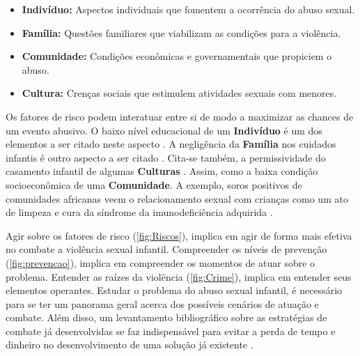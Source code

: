 \begin{itemize}
  \item \textbf{Indivíduo:} \hfill Aspectos individuais que fomentem a ocorrência do abuso sexual. %
  \item \textbf{Família:} \hfill Questões familiares que viabilizam as condições para a violência.  %
  \item \textbf{Comunidade:} Condições econômicas e governamentais que propiciem o abuso.
  \item \textbf{Cultura:} \hfill Crenças sociais que estimulem atividades sexuais com menores. 
\end{itemize}


Os fatores de risco podem interatuar entre si de modo a maximizar as chances de um evento abusivo. O baixo nível educacional de um \textbf{Indivíduo} é um dos elementos a ser citado neste aspecto \cite{dahlberg2006violencia}. A negligência da \textbf{Família} nos cuidados infantis é outro aspecto a ser citado \cite{blasco2018abuso}. Cita-se também, a permissividade do casamento infantil de algumas \textbf{Culturas} \cite{bandiera2017women}. Assim, como a baixa condição socioeconômica de uma \textbf{Comunidade}. A exemplo, soros positivos de comunidades africanas veem o relacionamento sexual com crianças como um ato de limpeza e cura da síndrome da imunodeficiência adquirida \cite{aded2006abuso}.



Agir sobre os fatores de risco (\autoref{fig:Riscos}), implica em agir de forma mais efetiva no combate a violência sexual infantil. Compreender os níveis de prevenção (\autoref{fig:prevencao}), implica em compreender os momentos de atuar sobre o problema. Entender as raízes da violência (\autoref{fig:Crime}), implica em entender seus elementos operantes. Estudar o problema do abuso sexual infantil, é necessário para se ter um panorama geral acerca dos possíveis cenários de atuação e combate. Além disso, um levantamento bibliográfico sobre as estratégias de combate já desenvolvidas se faz indispensável para evitar a perda de tempo e dinheiro no desenvolvimento de uma solução já existente \cite{wazlawick2014metodologia}. 

